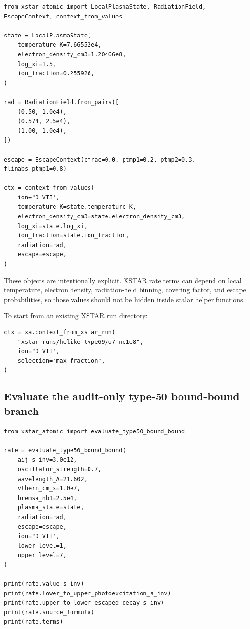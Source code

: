 \documentclass[11pt]{article}
\begin{document}
\begin{lstlisting}[style=ctpython]
from xstar_atomic import LocalPlasmaState, RadiationField, EscapeContext, context_from_values

state = LocalPlasmaState(
    temperature_K=7.66552e4,
    electron_density_cm3=1.20466e8,
    log_xi=1.5,
    ion_fraction=0.255926,
)

rad = RadiationField.from_pairs([
    (0.50, 1.0e4),
    (0.574, 2.5e4),
    (1.00, 1.0e4),
])

escape = EscapeContext(cfrac=0.0, ptmp1=0.2, ptmp2=0.3, flinabs_ptmp1=0.8)

ctx = context_from_values(
    ion="O VII",
    temperature_K=state.temperature_K,
    electron_density_cm3=state.electron_density_cm3,
    log_xi=state.log_xi,
    ion_fraction=state.ion_fraction,
    radiation=rad,
    escape=escape,
)
\end{lstlisting}

These objects are intentionally explicit. XSTAR rate terms can depend on local temperature, electron density, radiation-field binning, covering factor, and escape probabilities, so those values should not be hidden inside scalar helper functions.

To start from an existing XSTAR run directory:

\begin{lstlisting}[style=ctpython]
ctx = xa.context_from_xstar_run(
    "xstar_runs/helike_type69/o7_ne1e8",
    ion="O VII",
    selection="max_fraction",
)
\end{lstlisting}

\subsection{Evaluate the audit-only type-50 bound-bound branch}

\begin{lstlisting}[style=ctpython]
from xstar_atomic import evaluate_type50_bound_bound

rate = evaluate_type50_bound_bound(
    aij_s_inv=3.0e12,
    oscillator_strength=0.7,
    wavelength_A=21.602,
    vtherm_cm_s=1.0e7,
    bremsa_nb1=2.5e4,
    plasma_state=state,
    radiation=rad,
    escape=escape,
    ion="O VII",
    lower_level=1,
    upper_level=7,
)

print(rate.value_s_inv)
print(rate.lower_to_upper_photoexcitation_s_inv)
print(rate.upper_to_lower_escaped_decay_s_inv)
print(rate.source_formula)
print(rate.terms)
\end{lstlisting}
\end{document}
